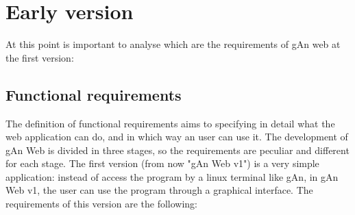 
\chapter{Early version} %

\label{Chapter3} %


At this point is important to analyse which are the requirements of gAn web at the first version:

\section{Functional requirements}
The definition of functional requirements aims to specifying in detail what the web application can do, and in which way an user can use it. The development of gAn Web is divided in three stages, so the requirements are peculiar and different for each stage. The first version (from now "gAn Web v1") is a very simple application: instead of access the program by a linux terminal like gAn, in gAn Web v1, the user can use the program through a graphical interface. 
The requirements of this version are the following:

